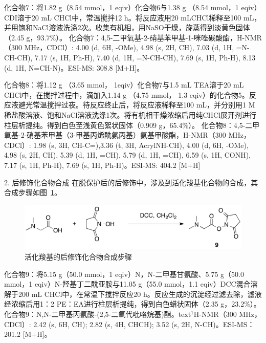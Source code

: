 化合物7：将1.82 g（8.54 mmol，1 eqiv）化合物6与1.38 g （8.54 mmol，1 eqiv）CDI溶于20 mL CHCl中，常温搅拌12 h。将反应液用20 mLCHCl稀释至100 mL，并用饱和NaCl溶液洗涤2次。收集有机相，用NaSO干燥，旋蒸得到淡黄色固体（2.45 g，93.7\%）。
化合物7：4,5-二甲氧基-2-硝基苯甲基-1-咪唑碳酸酯，H-NMR（300 MHz，CDCl）: \text{$\delta$} 4.00 (d, 6H, -OMe), 4.98 (s, 2H, CH), 7.03 (d, 1H, =N-CH-CH), 7.17 (s, 1H, Ph-H), 7.40 (d, 1H, =N-CH-CH), 7.69 (s, 1H, Ph-H), 8.13 (d, 1H, N=CH-N)。ESI-MS: 308.8 [M+H]\text{$^+$}。


化合物8：将1.12 g （3.65 mmol， 1eqiv）化合物7与1.5 mL TEA溶于20 mL CHCl中，在搅拌过程中，滴加入1.14 g （4.75 mmol， 1.3 eqiv）的化合物5。反应液避光常温搅拌过夜。待反应终止后，将反应液稀释至100 mL，并分别用1 M稀盐酸溶液、饱和NaCl溶液洗涤1次。将有机相干燥浓缩后用纯CHCl展开剂进行柱层析提纯。得到白色至浅黄色絮状固体（0.909 g，65.4\%）。
化合物8：4,5-二甲氧基-2-硝基苯甲基（3-甲基丙烯酰氨丙基）氨基甲酸酯，H-NMR（300 MHz，CDCl）: \text{$\delta$} 1.98 (s, 3H, CH-C=),3.36 (t, 3H, AcrylNH-CH), 4.00 (d, 6H, -OMe), 4.98 (s, 2H, CH), 5.39 (d, 1H, =CH), 5.79 (d, 1H, =CH), 6.59 (s, 1H, CONH), 7.17 (s, 1H, Ph-H), 7.69 (s, 1H, Ph-H)。ESI-MS: 404.2 [M+H]\text{$^+$}

2. 后修饰化合物合成
在脱保护后的后修饰中，涉及到活化羧基化合物的合成，其合成步骤如图~\ref{fig:postmod-sync}。
\begin{figure}[htbp]
  \centering
  \includegraphics[width=0.75\linewidth]{figures/ch4/ch4-post-mod-synth.png}
  \caption{活化羧基的后修饰化合物合成步骤}
  \label{fig:postmod-sync}
\end{figure}

化合物9：将5.15 g（50.0 mmol，1 eqiv）N，N-二甲基甘氨酸、5.75 g（50.0 mmol，1 eqiv）N-羟基丁二酰亚胺与11.05 g（55.0 mmol，1.1 eqiv）DCC混合溶解于200 mL CHCl中，在常温下搅拌反应20 h。反应生成的沉淀经过滤去除，滤液经浓缩后用1：2 PE：EA进行柱层析提纯，得到白色蜡状固体（2.35 g，23.2\%）。
化合物9：N,N-二甲基丙氨酸-(2,5-二氧代吡咯烷基)酯。text{$^1$}H-NMR（300 MHz，CDCl）: \text{$\delta$} 2.42 (s, 6H, CH); 2.82 (s, 4H, CHCH); 3.52 (s, 2H, N-CH)。ESI-MS：201.2 [M+H]\text{$^+$}。


